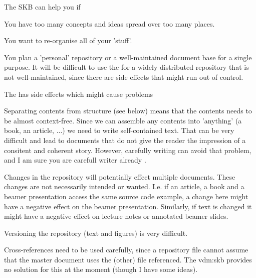 
The SKB can help you if
\begin{skbnotelist}
  \item You have too many concepts and ideas spread over too many places.
  \item You want to re-organise all of your 'stuff'.
  \item You plan a 'personal' repository or a well-maintained document base for a single purpose.
        It will be difficult to use the  for a widely distributed repository that is not
        well-maintained, since there are side effects that might run out of control.
\end{skbnotelist}

The  has side effects which might cause problems
\begin{skbnotelist}
  \item Separating contents from structure (see below) means that the contents needs to be 
        almost context-free. Since we can assemble any contents into 'anything' (a book, an article, ...)
        we need to write self-contained text. That can be very difficult and lead to documents that do not give the 
        reader the impression of a consitent and coherent story. However, carefully writing can avoid that problem,
        and I am sure you are carefull writer already \smiley.
  \item Changes in the repository will potentially effect multiple documents. These changes
        are not necessarily intended or wanted. I.e. if an article, a book and a beamer
        presentation access the same source code example, a change here might have a negative
        effect on the beamer presentation. Similarly, if text is changed it might have a negative
        effect on lecture notes or annotated beamer slides.
  \item Versioning the repository (text and figures) is very difficult.
  \item Cross-references need to be used carefully, since a repository file cannot assume that 
        the master document uses the (other) file referenced. The \ac{vdm:skb} provides no solution for this 
        at the moment (though I have some ideas).
\end{skbnotelist}